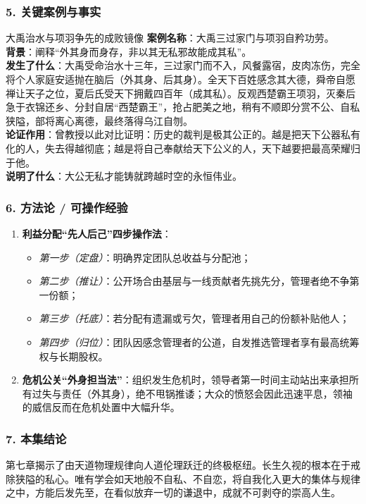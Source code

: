\subsubsection{5. 关键案例与事实}
\begin{CaseBox}{大禹治水与项羽争先的成败镜像}
\textbf{案例名称}：大禹三过家门与项羽自矜功劳。\\
\textbf{背景}：阐释“外其身而身存，非以其无私邪故能成其私”。\\
\textbf{发生了什么}：大禹受命治水十三年，三过家门而不入，风餐露宿，皮肉冻伤，完全将个人家庭安适抛在脑后（外其身、后其身）。全天下百姓感念其大德，舜帝自愿禅让天子之位，夏后氏受天下拥戴四百年（成其私）。反观西楚霸王项羽，灭秦后急于衣锦还乡、分封自居“西楚霸王”，抢占肥美之地，稍有不顺即分赏不公、自私狭隘，部将离心离德，最终落得乌江自刎。\\
\textbf{论证作用}：曾教授以此对比证明：历史的裁判是极其公正的。越是把天下公器私有化的人，失去得越彻底；越是将自己奉献给天下公义的人，天下越要把最高荣耀归于他。\\
\textbf{说明了什么}：大公无私才能铸就跨越时空的永恒伟业。
\end{CaseBox}

\subsubsection{6. 方法论 / 可操作经验}
\begin{enumerate}
    \item \textbf{利益分配“先人后己”四步操作法}：
    \begin{itemize}
        \item \emph{第一步（定盘）}：明确界定团队总收益与分配池；
        \item \emph{第二步（推让）}：公开场合由基层与一线贡献者先挑先分，管理者绝不争第一份额；
        \item \emph{第三步（托底）}：若分配有遗漏或亏欠，管理者用自己的份额补贴他人；
        \item \emph{第四步（归位）}：团队因感念管理者的公道，自发推选管理者享有最高统筹权与长期股权。
    \end{itemize}
    \item \textbf{危机公关“外身担当法”}：组织发生危机时，领导者第一时间主动站出来承担所有过失与责任（外其身），绝不甩锅推诿；大众的愤怒会因此迅速平息，领袖的威信反而在危机处置中大幅升华。
\end{enumerate}

\subsubsection{7. 本集结论}
第七章揭示了由天道物理规律向人道伦理跃迁的终极枢纽。长生久视的根本在于戒除狭隘的私心。唯有学会如天地般不自私、不自恋，将自我化入更大的集体与规律之中，方能后发先至，在看似放弃一切的谦退中，成就不可剥夺的崇高人生。

